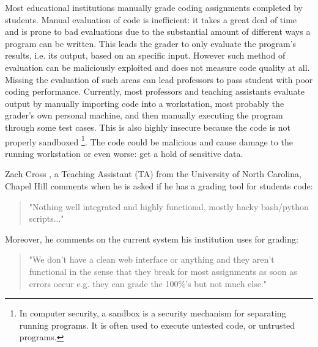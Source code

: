 

Most educational institutions manually grade coding assignments completed by
students. Manual evaluation of code is inefficient: it takes a great deal of
time and is prone to bad evaluations due to the substantial amount of different
ways a program can be written. This leads the grader to only evaluate the
program's results, i.e. its output, based on an specific input. However such
method of evaluation can be maliciously exploited and does not measure code
quality at all. Missing the evaluation of such areas can lead professors to pass
student with poor coding performance. Currently, most professors and teaching
assistants evaluate output by manually importing code into a workstation, most
probably the grader's own personal machine, and then manually executing the
program through some test cases. This is also highly insecure because the code
is not properly sandboxed \footnote{In computer security, a sandbox is a
security mechanism for separating running programs. It is often used to execute
untested code, or untrusted programs.}. The code could be malicious and cause
damage to the running workstation or even worse: get a hold of sensitive data.


Zach Cross \cite{Zach}, a Teaching Assistant (TA) from the University of North Carolina,
Chapel Hill comments when he is asked if he has a grading tool for students
code: \begin{quote} "Nothing well integrated and highly functional, mostly hacky
bash/python scripts..." \end{quote} Moreover, he comments on the current system
his institution uses for grading: \begin{quote} "We don't have a clean web
interface or anything and they aren't functional in the sense that they break
for most assignments as soon as errors occur e.g. they can grade the 100\%'s but
not much else." \end{quote}

